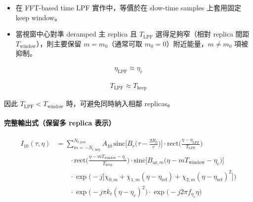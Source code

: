 \documentclass[10pt]{article}
\providecommand{\tightlist}{%
  \setlength{\itemsep}{0pt}\setlength{\parskip}{0pt}}
\begin{document}
\begin{itemize}
\tightlist
\item
  在 FFT-based time LPF 實作中，等價於在 slow-time samples 上套用固定
  keep window。
\item
  當視窗中心對準 deramped 主 replica 且 \(T_{\mathrm{LPF}}\)
  選得足夠窄（相對 replica 間距 \(T_{\mathrm{window}}\)），則主要保留
  \(m=m_0\)（通常可取 \(m_0=0\)）附近能量，\(m\neq m_0\) 項被抑制。
\end{itemize}

\begin{equation}
\begin{aligned}
\eta_{\mathrm{LPF}} \approx \eta_c
\end{aligned}
\end{equation}

\begin{equation}
\begin{aligned}
T_{\mathrm{LPF}} \approx T_{\mathrm{keep}}
\end{aligned}
\end{equation}

因此 \(T_{\mathrm{LPF}} < T_{\mathrm{window}}\) 時，可避免同時納入相鄰
replicas。

\hypertarget{ux5b8cux6574ux8f38ux51faux5f0fux4fddux7559ux591a-replica-ux8868ux793a}{%
\paragraph{完整輸出式（保留多 replica
表示）}\label{ux5b8cux6574ux8f38ux51faux5f0fux4fddux7559ux591a-replica-ux8868ux793a}}

\begin{equation}
\begin{aligned}
I_{10}(\tau,\eta)
&=
\sum_{m=-N_{t,\mathrm{neg}}}^{N_{t,\mathrm{pos}}} A_{10}\,
\mathrm{sinc}\biggl[ B_r\biggl( \tau-\frac{2R_0}{c} \biggr) \biggr]
\cdot \mathrm{rect}\biggl( \frac{\eta-\eta_{\mathrm{LPF}}}{T_{\mathrm{LPF}}} \biggr)\\
&\qquad \cdot \mathrm{rect}\biggl( \frac{\eta-mT_{\mathrm{window}}-\eta_c}{T_{\mathrm{keep}}} \biggr)
\cdot \mathrm{sinc}\biggl[ B_{\mathrm{az},m}\biggl( \eta-mT_{\mathrm{window}}-\eta_c \biggr) \biggr]\\
&\qquad \cdot \exp\biggl( -j\biggl[ \chi_{0,m}+\chi_{1,m}(\eta-\eta_{\mathrm{ref}})
+\chi_{2,m}(\eta-\eta_{\mathrm{ref}})^2 \biggr] \biggr)\\
&\qquad \cdot \exp\biggl( -j\pi k_t(\eta-\eta_c)^2 \biggr)
\cdot \exp\biggl( -j2\pi f_{\eta_c}\eta \biggr)
\end{aligned}
\end{equation}
\end{document}
